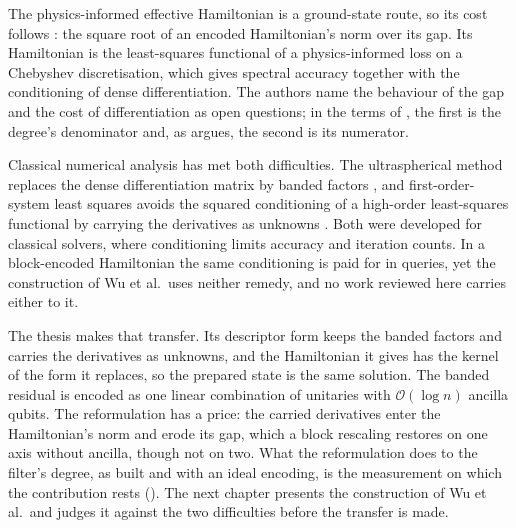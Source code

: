 The physics-informed effective Hamiltonian is a ground-state route, so its cost follows : the square root of an encoded Hamiltonian's norm over its gap. Its Hamiltonian is the least-squares functional of a physics-informed loss on a Chebyshev discretisation, which gives spectral accuracy together with the conditioning of dense differentiation. The authors name the behaviour of the gap and the cost of differentiation as open questions; in the terms of , the first is the degree's denominator and, as  argues, the second is its numerator.

Classical numerical analysis has met both difficulties. The ultraspherical method replaces the dense differentiation matrix by banded factors \cite{olver2013}, and first-order-system least squares avoids the squared conditioning of a high-order least-squares functional by carrying the derivatives as unknowns \cite{cai1994fosls}. Both were developed for classical solvers, where conditioning limits accuracy and iteration counts. In a block-encoded Hamiltonian the same conditioning is paid for in queries, yet the construction of Wu et al.\ uses neither remedy, and no work reviewed here carries either to it.

The thesis makes that transfer. Its descriptor form keeps the banded factors and carries the derivatives as unknowns, and the Hamiltonian it gives has the kernel of the form it replaces, so the prepared state is the same solution. The banded residual is encoded as one linear combination of unitaries with $\mathcal O(\log n)$ ancilla qubits. The reformulation has a price: the carried derivatives enter the Hamiltonian's norm and erode its gap, which a block rescaling restores on one axis without ancilla, though not on two. What the reformulation does to the filter's degree, as built and with an ideal encoding, is the measurement on which the contribution rests (). The next chapter presents the construction of Wu et al.\ and judges it against the two difficulties before the transfer is made.

